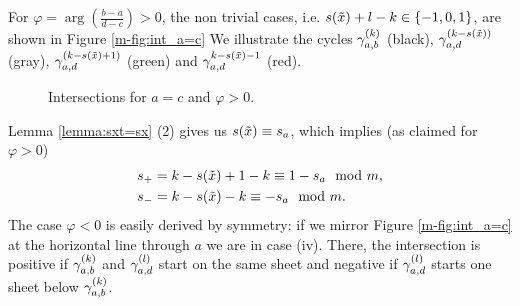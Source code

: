 \documentclass[main.tex]{subfiles}
\begin{document}
 For $\varphi = \arg\left(\frac{b-a}{d-c}\right) > 0$, the non trivial cases, i.e. $s(\tilde{x}) + l - k \in \{-1,0,1\}$, are shown in Figure \ref{m-fig:int_a=c}
  We illustrate the cycles $\gamma_{a,b}^{(k)}$ (black), $\gamma_{a,d}^{(k-s(\tilde{x}))}$ (gray), $\gamma_{a,d}^{(k-s(\tilde{x}) + 1)}$ (green) and
    $\gamma_{a,d}^{k-s(\tilde{x})-1}$ (red).
  \begin{figure}[H]
      \begin{center}
   \scalebox{0.8}{}
      \end{center}
    \caption{Intersections for $a=c$ and $\varphi > 0$.}
    \label{fig:int_a=c}
   \end{figure}
   Lemma \ref{lemma:sxt=sx} (2) gives us $s(\tilde{x}) \equiv s_a$, which implies (as claimed for $\varphi > 0$)
    \begin{align*}
    & s_+ = k-s(\tilde{x})+1-k \equiv 1-s_a \mod m, \\
    & s_- = k-s(\tilde{x})-k \equiv -s_a \mod m.
    \end{align*}
  The case $\varphi < 0$ is easily derived by symmetry: if we mirror Figure \ref{m-fig:int_a=c} at the horizontal line through $a$ we are in case (iv).
  There, the intersection is positive if $\gamma_{a,b}^{(k)}$ and $\gamma_{a,d}^{(l)}$ start on the same sheet and negative if $\gamma_{a,d}^{(l)}$ starts one sheet below $\gamma_{a,b}^{(k)}$.
\end{document}
